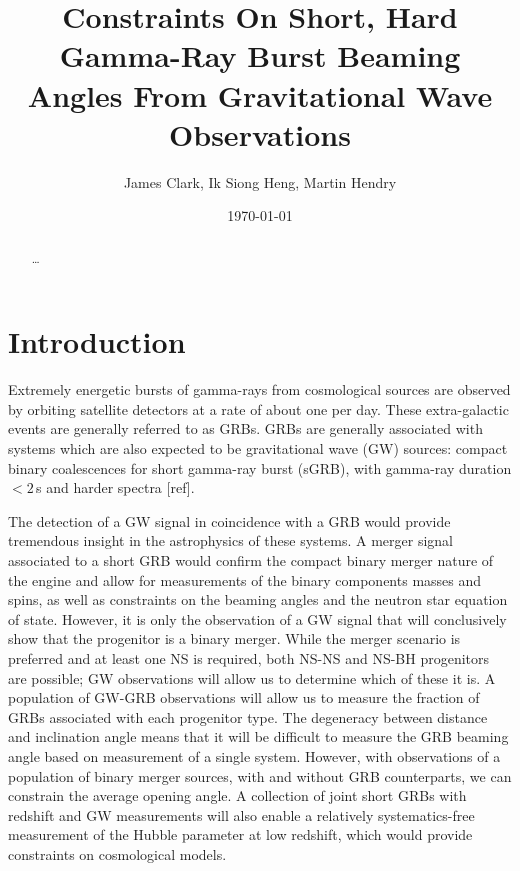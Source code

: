 \documentclass[twocolumn,nofootinbib]{revtex4-1}
\def\gw#1{gravitational wave#1 (GW#1)\gdef\gw{GW}}
\def\sgrb#1{short gamma-ray burst#1 (sGRB#1)\gdef\sgrb{sGRB}}
\newcommand{\about}[1]{{\color{blue}{[THIS SECTION: #1]}}}
\begin{document}
\title{Constraints On Short, Hard Gamma-Ray Burst Beaming Angles From
Gravitational Wave Observations}
\author{James Clark, Ik Siong Heng, Martin Hendry}
\date{\today}

\begin{abstract}
\dots
\end{abstract}

\maketitle

\section{Introduction}

\about{Intro with also many words taken from search plans}

Extremely energetic bursts of gamma-rays from cosmological sources are observed by orbiting satellite detectors at a rate of about one per day. These extra-galactic events are generally referred to as GRBs.
GRBs are generally associated with systems which are also expected to be \gw{} sources: compact binary coalescences for \sgrb{}, with gamma-ray duration $<\!2\,$s and harder spectra [ref].

The detection of a GW signal in coincidence with a GRB would provide tremendous insight in the  astrophysics of these systems.
A merger signal associated to a short GRB would confirm the compact binary merger nature of the engine and allow for measurements of the binary components masses and spins, as well as constraints on the beaming angles and the neutron star equation of state.
However, it is only the observation of a GW signal that will conclusively show that the progenitor is a binary merger. While the merger scenario is preferred and at least one NS is required, both NS-NS and NS-BH progenitors are possible; GW observations will allow us to determine which of these it is. A population of GW-GRB observations will allow us to measure the fraction of GRBs associated with each progenitor type. The degeneracy between distance and inclination angle means that it will be difficult to measure the GRB beaming angle based on measurement of a single system. However, with observations of a population of binary merger sources, with and without GRB counterparts, we can constrain the average opening angle.   
A collection of joint short GRBs with redshift and GW measurements will also enable a relatively systematics-free measurement of the Hubble parameter at low redshift, which would provide constraints on cosmological models.
\end{document}
